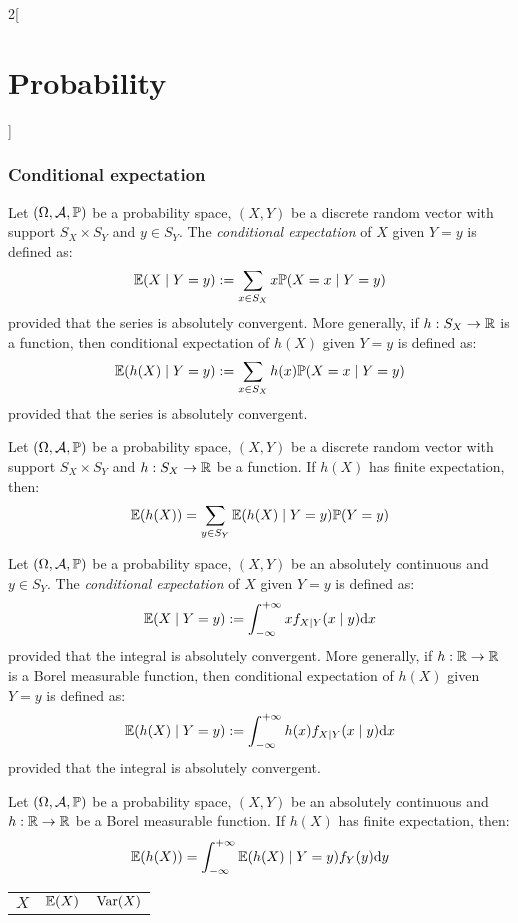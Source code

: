 \documentclass[../../../main.tex]{subfiles}
\begin{document}
\begin{multicols}{2}[\section{Probability}]
  \subsubsection{Conditional expectation}
  \begin{definition}
    Let $(\Omega,\mathcal{A},\mathbb{P})$ be a probability space, $(X,Y)$ be a discrete random vector with support $S_X\times S_Y$ and $y\in S_Y$. The \textit{conditional expectation} of $X$ given $Y=y$ is defined as: $$\mathbb{E}(X\mid Y=y):=\sum_{x\in S_X}x\mathbb{P}(X=x\mid Y=y)$$ provided that the series is absolutely convergent. More generally, if $h:S_X\rightarrow\mathbb{R}$ is a function, then conditional expectation of $h(X)$ given $Y=y$ is defined as: $$\mathbb{E}(h(X)\mid Y=y):=\sum_{x\in S_X}h(x)\mathbb{P}(X=x\mid Y=y)$$ provided that the series is absolutely convergent.
  \end{definition}
  \begin{prop}
    Let $(\Omega,\mathcal{A},\mathbb{P})$ be a probability space, $(X,Y)$ be a discrete random vector with support $S_X\times S_Y$ and $h:S_X\rightarrow\mathbb{R}$ be a function. If $h(X)$ has finite expectation, then: $$\mathbb{E}(h(X))=\sum_{y\in S_Y}\mathbb{E}(h(X)\mid Y=y)\mathbb{P}(Y=y)$$
  \end{prop}
  \begin{definition}
    Let $(\Omega,\mathcal{A},\mathbb{P})$ be a probability space, $(X,Y)$ be an absolutely continuous and $y\in S_Y$. The \textit{conditional expectation} of $X$ given $Y=y$ is defined as: $$\mathbb{E}(X\mid Y=y):=\int_{-\infty}^{+\infty}xf_{X\mid Y}(x\mid y)\dd x$$ provided that the integral is absolutely convergent. More generally, if $h:\mathbb{R}\rightarrow\mathbb{R}$ is a Borel measurable function, then conditional expectation of $h(X)$ given $Y=y$ is defined as: $$\mathbb{E}(h(X)\mid Y=y):=\int_{-\infty}^{+\infty}h(x)f_{X\mid Y}(x\mid y)\dd x$$ provided that the integral is absolutely convergent.
  \end{definition}
  \begin{prop}
    Let $(\Omega,\mathcal{A},\mathbb{P})$ be a probability space, $(X,Y)$ be an absolutely continuous and $h:\mathbb{R}\rightarrow\mathbb{R}$ be a Borel measurable function. If $h(X)$ has finite expectation, then: $$\mathbb{E}(h(X))=\int_{-\infty}^{+\infty}\mathbb{E}(h(X)\mid Y=y)f_Y(y)\dd y$$
  \end{prop}
  \begin{center}
    \def\arraystretch{1.25}
    \begin{tabular}{|c|c|c|}
      \hline
      $X$                      & $\displaystyle \mathbb{E}(X)$        & $\displaystyle \operatorname{Var}(X)$                     \\

\end{tabular}
\end{center}
\end{multicols}
\end{document}
